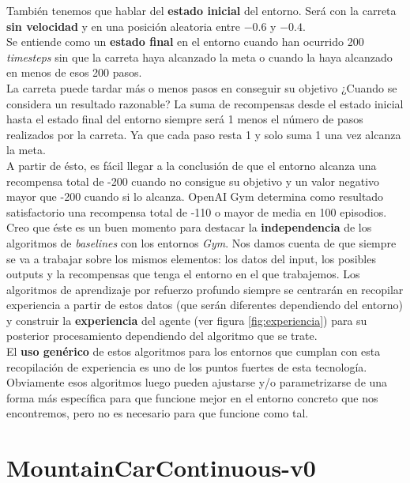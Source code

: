 \documentclass[11pt,fleqn]{book} %
\begin{document}
También tenemos que hablar del \textbf{estado inicial} del entorno. Será con la carreta \textbf{sin velocidad} y en una posición aleatoria entre $-0.6$ y $-0.4$.\\

Se entiende como un \textbf{estado final} en el entorno cuando han ocurrido 200 \textit{timesteps} sin que la carreta haya alcanzado la meta o cuando la haya alcanzado en menos de esos 200 pasos. \\

La carreta puede tardar más o menos pasos en conseguir su objetivo ¿Cuando se considera un resultado razonable? La suma de recompensas desde el estado inicial hasta el estado final del entorno siempre será 1 menos el número de pasos realizados por la carreta. Ya que cada paso resta 1 y solo suma 1 una vez alcanza la meta. \\

A partir de ésto, es fácil llegar a la conclusión de que el entorno alcanza una recompensa total de -200 cuando no consigue su objetivo y un valor negativo mayor que -200 cuando si lo alcanza. OpenAI Gym determina como resultado satisfactorio una recompensa total de -110 o mayor de media en 100 episodios.\cite{article:mountain} \\

Creo que éste es un buen momento para destacar la \textbf{independencia} de los algoritmos de \textit{baselines} con los entornos \textit{Gym}. Nos damos cuenta de que siempre se va a trabajar sobre los mismos elementos: los datos del input, los posibles outputs y la recompensas que tenga el entorno en el que trabajemos. Los algoritmos de aprendizaje por refuerzo profundo siempre se centrarán en recopilar experiencia a partir de estos datos (que serán diferentes dependiendo del entorno) y construir la \textbf{experiencia} del agente (ver figura \ref{fig:experiencia}) para su posterior procesamiento dependiendo del algoritmo que se trate. \\

El \textbf{uso genérico} de estos algoritmos para los entornos que cumplan con esta recopilación de experiencia es uno de los puntos fuertes de esta tecnología. Obviamente esos algoritmos luego pueden ajustarse y/o parametrizarse de una forma más específica para que funcione mejor en el entorno concreto que nos encontremos, pero no es necesario para que funcione como tal.

\section{MountainCarContinuous-v0}\label{sec:mountaincarcontinuo}
\end{document}
